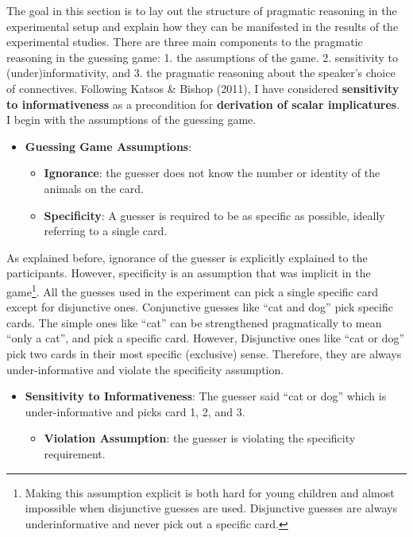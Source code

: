 \documentclass[oneside]{report}
\theoremstyle{definition}
\theoremstyle{definition}
\theoremstyle{definition}
\theoremstyle{remark}
\begin{document}
The goal in this section is to lay out the structure of pragmatic
reasoning in the experimental setup and explain how they can be
manifested in the results of the experimental studies. There are three
main components to the pragmatic reasoning in the guessing game: 1. the
assumptions of the game. 2. sensitivity to (under)informativity, and 3.
the pragmatic reasoning about the speaker's choice of connectives.
Following Katsos \& Bishop (2011), I have considered \textbf{sensitivity
to informativeness} as a precondition for \textbf{derivation of scalar
implicatures}. I begin with the assumptions of the guessing game.
\begin{itemize}
\tightlist
\item
  \textbf{Guessing Game Assumptions}:
  \begin{itemize}
  \tightlist
  \item
    \textbf{Ignorance}: the guesser does not know the number or identity
    of the animals on the card.
  \item
    \textbf{Specificity}: A guesser is required to be as specific as
    possible, ideally referring to a single card.
  \end{itemize}
\end{itemize}
As explained before, ignorance of the guesser is explicitly explained to
the participants. However, specificity is an assumption that was
implicit in the game\footnote{Making this assumption explicit is both
  hard for young children and almost impossible when disjunctive guesses
  are used. Disjunctive guesses are always underinformative and never
  pick out a specific card.}. All the guesses used in the experiment can
pick a single specific card except for disjunctive ones. Conjunctive
guesses like ``cat and dog'' pick specific cards. The simple ones like
``cat'' can be strengthened pragmatically to mean ``only a cat'', and
pick a specific card. However, Disjunctive ones like ``cat or dog'' pick
two cards in their most specific (exclusive) sense. Therefore, they are
always under-informative and violate the specificity assumption.
\begin{itemize}
\tightlist
\item
  \textbf{Sensitivity to Informativeness}: The guesser said ``cat or
  dog'' which is under-informative and picks card 1, 2, and 3.
  \begin{itemize}
  \tightlist
  \item
    \textbf{Violation Assumption}: the guesser is violating the
    specificity requirement.
  \end{itemize}
\end{itemize}
\end{document}
